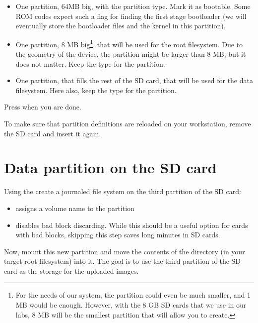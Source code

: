 \begin{itemize}

\item One partition, 64MB big, with the  partition type.
  Mark it as bootable. Some ROM codes expect such a flag for
  finding the first stage bootloader (we will eventually store the
  bootloader files and the kernel in this partition).

\item One partition, 8 MB big\footnote{For the needs of our system,
  the partition could even be much smaller, and 1 MB would be enough.
  However, with the 8 GB SD cards that we use in our labs, 8 MB will
  be the smallest partition that  will allow you to
  create.}, that will be used for the root filesystem. Due to the
  geometry of the device, the partition might be larger than 8 MB,
  but it does not matter. Keep the  type for the
  partition.

\item One partition, that fills the rest of the SD card, that will be
  used for the data filesystem. Here also, keep the  type
  for the partition.

\end{itemize}

Press  when you are done.

To make sure that partition definitions are reloaded on your
workstation, remove the SD card and insert it again.

\section{Data partition on the SD card}

Using the  create a journaled file system on the
third partition of the SD card:


\begin{itemize}
\item {} assigns a volume name to the partition
\item {} disables bad block discarding. While this
      should be a useful option for cards with bad blocks, skipping
      this step saves long minutes in SD cards.
\end{itemize}

Now, mount this new partition and move the contents of the
 directory (in your target root filesystem) into
it. The goal is to use the third partition of the SD card as the storage
for the uploaded images.

